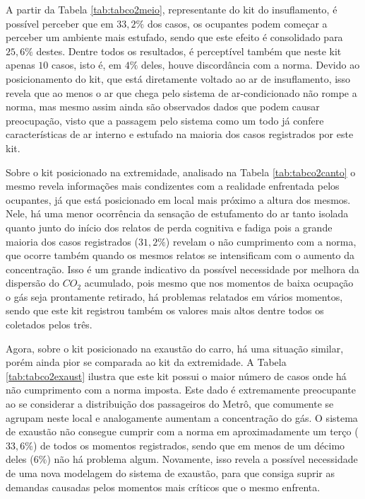 \documentclass[acronym,symbols,table]{fei}
\begin{document}
\newpage

A partir da Tabela \ref{tab:tabco2meio}, representante do kit do insuflamento, é possível perceber que em $33,2\%$ dos casos, os ocupantes podem começar a perceber um ambiente mais estufado, sendo que este efeito é consolidado para $25,6\%$ destes. Dentre todos os resultados, é perceptível também que neste kit apenas $10$ casos, isto é, em $4\%$ deles, houve discordância com a norma. Devido ao posicionamento do kit, que está diretamente voltado ao ar de insuflamento, isso revela que ao menos o ar que chega pelo sistema de ar-condicionado não rompe a norma, mas mesmo assim ainda são observados dados que podem causar preocupação, visto que a passagem pelo sistema como um todo já confere características de ar interno e estufado na maioria dos casos registrados por este kit.

Sobre o kit posicionado na extremidade, analisado na Tabela \ref{tab:tabco2canto} o mesmo revela informações mais condizentes com a realidade enfrentada pelos ocupantes, já que está posicionado em local mais próximo a altura dos mesmos. Nele, há uma menor ocorrência da sensação de estufamento do ar tanto isolada quanto junto do início dos relatos de perda cognitiva e fadiga pois a grande maioria dos casos registrados ($31,2\%$) revelam o não cumprimento com a norma, que ocorre também quando os mesmos relatos se intensificam com o aumento da concentração. Isso é um grande indicativo da possível necessidade por melhora da dispersão do ${CO}_{2}$ acumulado, pois mesmo que nos momentos de baixa ocupação o gás seja prontamente retirado, há problemas relatados em vários momentos, sendo que este kit registrou também os valores mais altos dentre todos os coletados pelos três.

Agora, sobre o kit posicionado na exaustão do carro, há uma situação similar, porém ainda pior se comparada ao kit da extremidade. A Tabela \ref{tab:tabco2exaust} ilustra que este kit possui o maior número de casos onde há não cumprimento com a norma imposta. Este dado é extremamente preocupante ao se considerar a distribuição dos passageiros do Metrô, que comumente se agrupam neste local e analogamente aumentam a concentração do gás. O sistema de exaustão não consegue cumprir com a norma em aproximadamente um terço ($33,6\%$) de todos os momentos registrados, sendo que em menos de um décimo deles ($6\%$) não há problema algum. Novamente, isso revela a possível necessidade de uma nova modelagem do sistema de exaustão, para que consiga suprir as demandas causadas pelos momentos mais críticos que o mesmo enfrenta.
\end{document}
